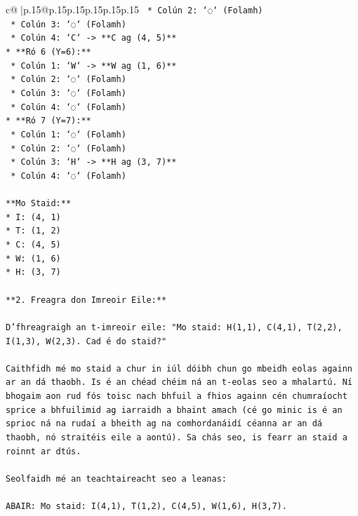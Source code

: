\documentclass{article}
\begin{document}
{\begin{supertabular}{c@{$\;$}|p{.15\linewidth}@{}p{.15\linewidth}p{.15\linewidth}p{.15\linewidth}p{.15\linewidth}p{.15\linewidth}}
{{{\texttt{    *   Colún 2: `◌` (Folamh)} \\
\texttt{    *   Colún 3: `◌` (Folamh)} \\
\texttt{    *   Colún 4: `C` {-}> **C ag (4, 5)**} \\
\texttt{*   **Ró 6 (Y=6):**} \\
\texttt{    *   Colún 1: `W` {-}> **W ag (1, 6)**} \\
\texttt{    *   Colún 2: `◌` (Folamh)} \\
\texttt{    *   Colún 3: `◌` (Folamh)} \\
\texttt{    *   Colún 4: `◌` (Folamh)} \\
\texttt{*   **Ró 7 (Y=7):**} \\
\texttt{    *   Colún 1: `◌` (Folamh)} \\
\texttt{    *   Colún 2: `◌` (Folamh)} \\
\texttt{    *   Colún 3: `H` {-}> **H ag (3, 7)**} \\
\texttt{    *   Colún 4: `◌` (Folamh)} \\
\\ 
\texttt{**Mo Staid:**} \\
\texttt{*   I: (4, 1)} \\
\texttt{*   T: (1, 2)} \\
\texttt{*   C: (4, 5)} \\
\texttt{*   W: (1, 6)} \\
\texttt{*   H: (3, 7)} \\
\\ 
\texttt{**2. Freagra don Imreoir Eile:**} \\
\\ 
\texttt{D'fhreagraigh an t{-}imreoir eile: "Mo staid: H(1,1), C(4,1), T(2,2), I(1,3), W(2,3). Cad é do staid?"} \\
\\ 
\texttt{Caithfidh mé mo staid a chur in iúl dóibh chun go mbeidh eolas againn ar an dá thaobh. Is é an chéad chéim ná an t{-}eolas seo a mhalartú. Ní bhogaim aon rud fós toisc nach bhfuil a fhios againn cén chumraíocht sprice a bhfuilimid ag iarraidh a bhaint amach (cé go minic is é an sprioc ná na rudaí a bheith ag na comhordanáidí céanna ar an dá thaobh, nó straitéis eile a aontú). Sa chás seo, is fearr an staid a roinnt ar dtús.} \\
\\ 
\texttt{Seolfaidh mé an teachtaireacht seo a leanas:} \\
\\ 
\texttt{ABAIR: Mo staid: I(4,1), T(1,2), C(4,5), W(1,6), H(3,7).} \\
            }
        }
    }
     \\ \\


\end{supertabular}}
\end{document}
